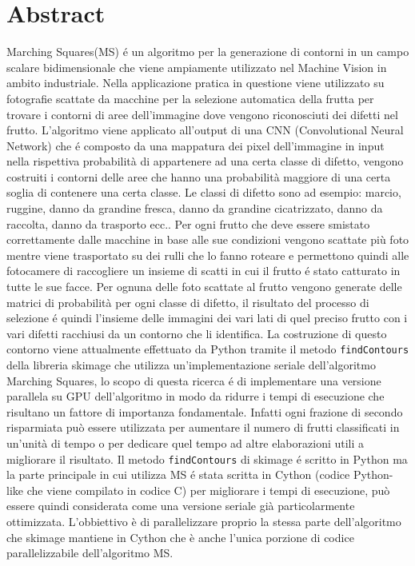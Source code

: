 \documentclass[12pt,a4paper]{report}
\begin{document}
\chapter{Abstract}
Marching Squares(MS) é un algoritmo per la generazione di contorni in un campo scalare bidimensionale che viene ampiamente utilizzato nel Machine Vision in ambito industriale. Nella applicazione pratica in questione viene utilizzato su fotografie scattate da macchine per la selezione automatica della frutta per trovare i contorni di aree dell'immagine dove vengono riconosciuti dei difetti nel frutto. L'algoritmo viene applicato all'output di una CNN (Convolutional Neural Network) che é composto da una mappatura dei pixel dell'immagine in input nella rispettiva probabilità di appartenere ad una certa classe di difetto, vengono costruiti i contorni delle aree che hanno una probabilità maggiore di una certa soglia di contenere una certa classe. Le classi di difetto sono ad esempio: marcio, ruggine, danno da grandine fresca, danno da grandine cicatrizzato, danno da raccolta, danno da trasporto ecc.. \newline
Per ogni frutto che deve essere smistato correttamente dalle macchine in base alle sue condizioni vengono scattate più foto mentre viene trasportato su dei rulli che lo fanno roteare e permettono quindi alle fotocamere di raccogliere un insieme di scatti in cui il frutto é stato catturato in tutte le sue facce. Per ognuna delle foto scattate al frutto vengono generate delle matrici di probabilità per ogni classe di difetto, il risultato del processo di selezione é quindi l'insieme delle immagini dei vari lati di quel preciso frutto con i vari difetti racchiusi da un contorno che li identifica. \newline 
La costruzione di questo contorno viene attualmente effettuato da Python tramite il metodo \verb|findContours| della libreria skimage che utilizza un'implementazione seriale dell'algoritmo Marching Squares, lo scopo di questa ricerca é di implementare una versione parallela su GPU dell'algoritmo in modo da ridurre i tempi di esecuzione che risultano un fattore di importanza fondamentale.  Infatti ogni frazione di secondo risparmiata può essere utilizzata per aumentare il numero di frutti classificati in un'unità di tempo o per dedicare quel tempo ad altre elaborazioni utili a migliorare il risultato. 
Il metodo \verb|findContours| di skimage é scritto in Python ma la parte principale in cui utilizza MS é stata scritta in Cython (codice Python-like che viene compilato in codice C) per migliorare i tempi di esecuzione, può essere quindi considerata come una versione seriale già particolarmente ottimizzata. \newline L'obbiettivo è di parallelizzare proprio la stessa parte dell'algoritmo che skimage mantiene in Cython che è anche l'unica porzione di codice parallelizzabile dell'algoritmo MS. \newline
\end{document}
